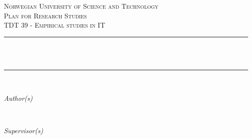 \begin{titlepage}
  	\newcommand{\HRule}{\rule{\linewidth}{0.3mm}} %
	\center %
	
	\textsc{\LARGE Norwegian University of Science and Technology}\\[1.5cm]
	
	\textsc{\Large Plan for Research Studies}\\[0.5cm]
	
	\textsc{\large TDT 39 - Empirical studies in IT}\\[0.5cm]
	
	
	\HRule\\[0.4cm]
	
	{\huge\bfseries \@title}\\[0.4cm]
	
	\HRule\\[1.5cm]
	
	\begin{minipage}{0.4\textwidth}
		\begin{flushleft}
			\large
			\textit{Author(s)}\\
			\@author %
		\end{flushleft}
	\end{minipage}
	~
	\begin{minipage}{0.4\textwidth}
		\begin{flushright}
			\large
			\textit{Supervisor(s)}\\
			\supervisors %
		\end{flushright}
	\end{minipage}
	
	
	

\end{titlepage}
